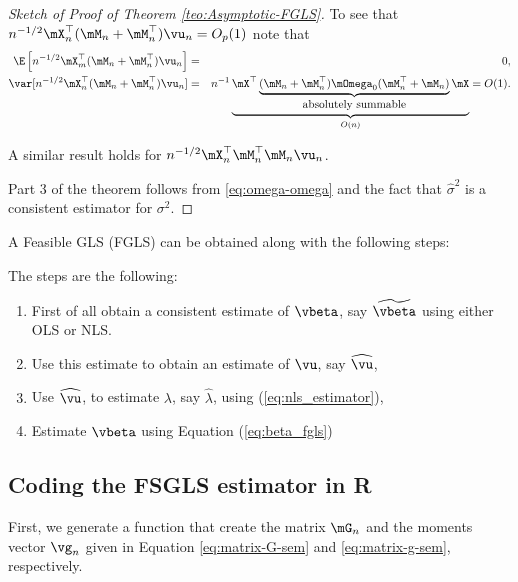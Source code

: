 \documentclass[english,12pt]{book}\usepackage[]{graphicx}\usepackage[]{xcolor}
\begin{document}
\begin{proof}[Sketch of Proof of Theorem \ref{teo:Asymptotic-FGLS}]
To see that $n^{-1/2}\mX^\top_n(\mM_n + \mM^\top_n)\vu_n = O_p(1)$ note that
\begin{eqnarray*}
\E\left[n^{-1/2}\mX^\top_m(\mM_n + \mM^\top_n)\vu_n\right] &=& 0, \\
\var[n^{-1/2}\mX^\top_n(\mM_n + \mM^\top_n)\vu_n] &=& n^{-1}\underbrace{\mX^\top\underbrace{(\mM_n + \mM^\top_n)\mOmega_0(\mM^\top_n + \mM_n)}_{\mbox{absolutely summable}}\mX}_{O(n)} = O(1).
\end{eqnarray*}

A similar result holds for $n^{-1/2}\mX^\top_n\mM^\top_n\mM_n\vu_n$.

Part 3 of the theorem follows from \eqref{eq:omega-omega} and the fact that $\widehat{\sigma}^2$ is a consistent estimator for $\sigma^2$.
\end{proof}


A Feasible GLS (FGLS) can be obtained along with the following steps:

\begin{algorithm}
The steps are the following:

\begin{enumerate}
  \item First of all obtain a consistent estimate of $\vbeta$, say $\widetilde{\vbeta}$ using either OLS or NLS.
  \item Use this estimate to obtain an estimate of $\vu$, say $\widehat{\vu}$,
  \item Use $\widehat{\vu}$, to estimate $\lambda$, say $\widehat{\lambda}$, using (\ref{eq:nls_estimator}),
  \item Estimate $\vbeta$ using Equation (\ref{eq:beta_fgls})
\end{enumerate}
\end{algorithm}


\subsection{Coding the FSGLS estimator in R}

First, we generate a function that create the matrix $\mG_n$ and the moments vector $\vg_n$ given in Equation \eqref{eq:matrix-G-sem} and \eqref{eq:matrix-g-sem}, respectively. 
\end{document}
